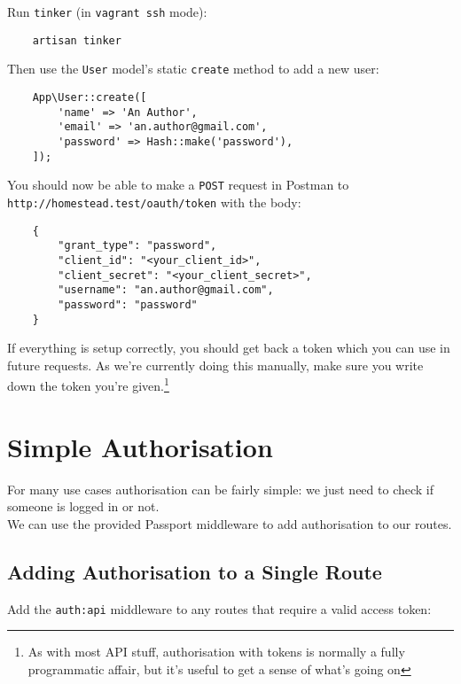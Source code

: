 Run \texttt{tinker} (in \texttt{vagrant ssh} mode):

\begin{verbatim}
    artisan tinker
\end{verbatim}

Then use the \texttt{User} model's static \texttt{create} method to add a new user:

\begin{verbatim}
    App\User::create([
        'name' => 'An Author',
        'email' => 'an.author@gmail.com',
        'password' => Hash::make('password'),
    ]);
\end{verbatim}

You should now be able to make a \texttt{POST} request in Postman to \\ \texttt{http://homestead.test/oauth/token} with the body:

\begin{verbatim}
    {
        "grant_type": "password",
        "client_id": "<your_client_id>",
        "client_secret": "<your_client_secret>",
        "username": "an.author@gmail.com",
        "password": "password"
    }
\end{verbatim}

If everything is setup correctly, you should get back a token which you can use in future requests. As we're currently doing this manually, make sure you write down the token you're given.\footnote{As with most API stuff, authorisation with tokens is normally a fully programmatic affair, but it's useful to get a sense of what's going on}


\pagebreak


\section{Simple Authorisation}

For many use cases authorisation can be fairly simple: we just need to check if someone is logged in or not.
\\

We can use the provided Passport middleware to add authorisation to our routes.


\subsection{Adding Authorisation to a Single Route}

Add the \texttt{auth:api} middleware to any routes that require a valid access token:

